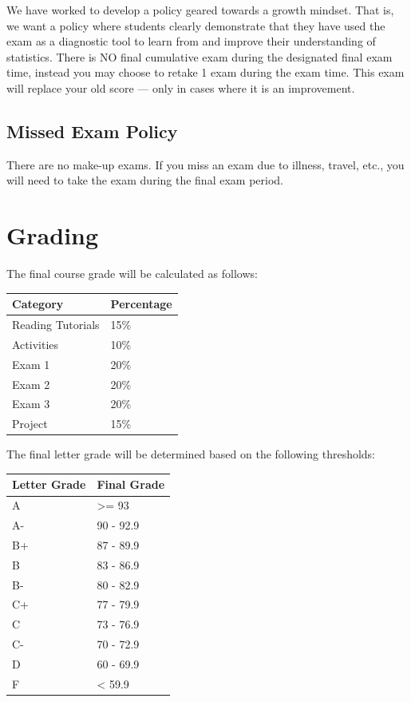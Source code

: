 \documentclass[
  letterpaper,
  DIV=11,
  numbers=noendperiod]{scrreprt}
\begin{document}
We have worked to develop a policy geared towards a growth mindset. That
is, we want a policy where students clearly demonstrate that they have
used the exam as a diagnostic tool to learn from and improve their
understanding of statistics. There is NO final cumulative exam during
the designated final exam time, instead you may choose to retake 1 exam
during the exam time. This exam will replace your old score --- only in
cases where it is an improvement.

\hypertarget{missed-exam-policy}{%
\subsection*{Missed Exam Policy}\label{missed-exam-policy}}

There are no make-up exams. If you miss an exam due to illness, travel,
etc., you will need to take the exam during the final exam period.

\hypertarget{grading}{%
\section*{Grading}\label{grading}}


The final course grade will be calculated as follows:

\begin{longtable}[]{@{}ll@{}}
\toprule\noalign{}
Category & Percentage \\
\midrule\noalign{}
\endhead
\bottomrule\noalign{}
\endlastfoot
Reading Tutorials & 15\% \\
Activities & 10\% \\
Exam 1 & 20\% \\
Exam 2 & 20\% \\
Exam 3 & 20\% \\
Project & 15\% \\
\end{longtable}

The final letter grade will be determined based on the following
thresholds:

\begin{longtable}[]{@{}ll@{}}
\toprule\noalign{}
Letter Grade & Final Grade \\
\midrule\noalign{}
\endhead
\bottomrule\noalign{}
\endlastfoot
A & \textgreater= 93 \\
A- & 90 - 92.9 \\
B+ & 87 - 89.9 \\
B & 83 - 86.9 \\
B- & 80 - 82.9 \\
C+ & 77 - 79.9 \\
C & 73 - 76.9 \\
C- & 70 - 72.9 \\
D & 60 - 69.9 \\
F & \textless{} 59.9 \\
\end{longtable}
\end{document}
